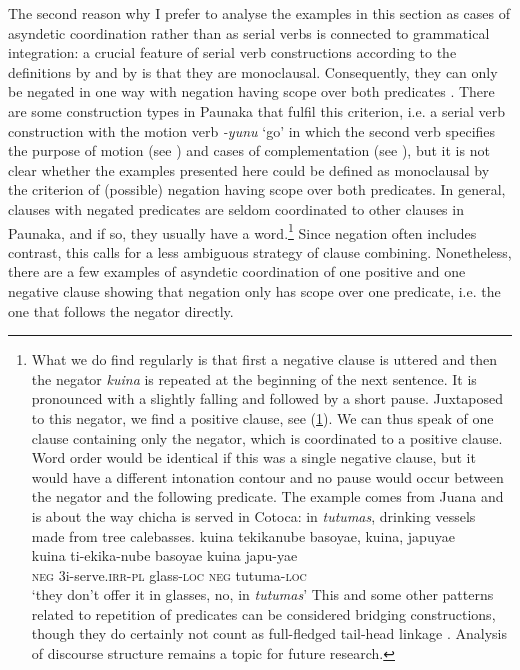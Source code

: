 The second reason why I prefer to analyse the examples in this section as cases of asyndetic coordination rather than as serial verbs is connected to grammatical integration: a crucial feature of serial verb constructions according to the definitions by \citet[296]{Haspelmath2016} and by \citet[1]{Aikhenvald2006} is that they are monoclausal. Consequently, they can only be negated in one way with negation having scope over both predicates \citep[299]{Haspelmath2016}. There are some construction types in Paunaka that fulfil this criterion, i.e. a serial verb construction with the motion verb \textit{-yunu} ‘go’ in which the second verb specifies the purpose of motion (see ) and cases of complementation (see ), but it is not clear whether the examples presented here could be defined as monoclausal by the criterion of (possible) negation having scope over both predicates. In general, clauses with negated predicates are seldom coordinated to other clauses in Paunaka, and if so, they usually have a  word.\footnote{\label{fn:negation-coordination}What we do find regularly is that first a negative clause is uttered and then the negator \textit{kuina} is repeated at the beginning of the next sentence. It is pronounced with a slightly falling  and followed by a short pause. Juxtaposed to this negator, we find a positive clause, see (\ref{ex:neg-fn-1}). We can thus speak of one clause containing only the negator, which is coordinated to a positive clause. Word order would be identical if this was a single negative clause, but it would have a different intonation contour and no pause would occur between the negator and the following predicate. The example comes from Juana and is about the way chicha is served in Cotoca: in \textit{tutumas}, drinking vessels made from tree calebasses. 
\ea\label{ex:neg-fn-1}
\begingl
\glpreamble kuina tekikanube basoyae, kuina, japuyae \\
\gla kuina ti-ekika-nube basoyae kuina japu-yae\\
\glb \textsc{neg} 3i-serve.\textsc{irr}-\textsc{pl} glass-\textsc{loc} \textsc{neg} tutuma-\textsc{loc}\\
\glft ‘they don’t offer it in glasses, no, in \textit{tutumas}’
\endgl
\trailingcitation{[jxx-p120430l-2.571-574]}
\xe
This and some other patterns related to repetition of predicates can be considered bridging constructions, though they do certainly not count as full-fledged tail-head linkage \citep[cf.][]{GuerinAiton2019}. Analysis of discourse structure remains a topic for future research.} Since negation often includes contrast, this calls for a less ambiguous strategy of clause combining. Nonetheless, there are a few examples of asyndetic coordination of one positive and one negative clause showing that negation only has scope over one predicate, i.e. the one that follows the negator directly.

